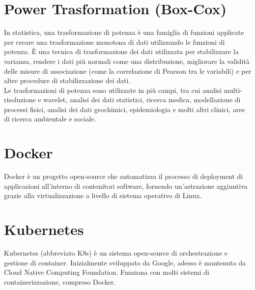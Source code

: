 \documentclass[12pt,a4paper]{report}
\begin{document}
\begin{appendices}
\section{Power Trasformation (Box-Cox)}
\label{appendix:Box-Cox}
In statistica, una trasformazione di potenza è una famiglia di funzioni applicate per creare una trasformazione monotona di dati utilizzando le funzioni di potenza. È una tecnica di trasformazione dei dati utilizzata per stabilizzare la varianza, rendere i dati più normali come una distribuzione, migliorare la validità delle misure di associazione (come la correlazione di Pearson tra le variabili) e per altre procedure di stabilizzazione dei dati.\\
Le trasformazioni di potenza sono utilizzate in più campi, tra cui analisi multi-risoluzione e wavelet, analisi dei dati statistici, ricerca medica, modellazione di processi fisici, analisi dei dati geochimici, epidemiologia e molti altri clinici, aree di ricerca ambientale e sociale.

\section{Docker}
\label{appendix:Docker}
Docker è un progetto open-source che automatizza il processo di deployment di applicazioni all'interno di contenitori software, fornendo un'astrazione aggiuntiva grazie alla virtualizzazione a livello di sistema operativo di Linux.\cite{itwiki:123095653}

\section{Kubernetes}
\label{appendix:Kubernetes}
Kubernetes (abbreviato K8s) è un sistema open-source di orchestrazione e gestione di container. Inizialmente sviluppato da Google, adesso è mantenuto da Cloud Native Computing Foundation. Funziona con molti sistemi di containerizzazione, compreso Docker.\cite{itwiki:119581182}


\end{appendices}
\end{document}
